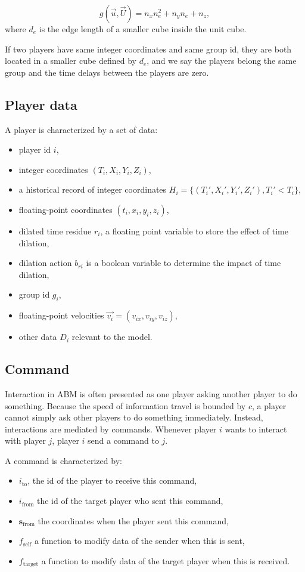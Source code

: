 \documentclass{article}
\begin{document}
\begin{equation} \label{eq:group}
    g(\overrightarrow{u}, \overrightarrow{U}) = n_x n_e^2 + n_y n_e + n_z,
\end{equation}
where $d_e$ is the edge length of a smaller cube inside the unit cube.

If two players have same integer coordinates and same group id,
they are both located in a smaller cube defined by $d_e$, 
and we say the players belong the same group and the time delays between the players are zero.

\subsection{Player data}

A player is characterized by a set of data:
\begin{itemize}
  \item player id $i$,
  \item integer coordinates $(T_i, X_i, Y_i, Z_i)$,
  \item a historical record of integer coordinates $H_i = \{(T_i', X_i', Y_i', Z_i'), T_i' < T_i \}$,
  \item floating-point coordinates $(t_i, x_i, y_i, z_i)$,
  \item dilated time residue $r_i$, a floating point variable to store the effect of time dilation,
  \item dilation action $b_{ri}$ is a boolean variable to determine the impact of time dilation,
  \item group id $g_i$,
  \item floating-point velocities $\overrightarrow{v_i} = (v_{ix}, v_{iy}, v_{iz})$,
  \item other data $D_i$ relevant to the model.
\end{itemize}

\subsection{Command}

Interaction in ABM is often presented as one player asking
another player to do something.
Because the speed of information travel is bounded by $c$,
a player cannot simply ask other players to do something immediately.
Instead, interactions are mediated by commands.
Whenever player $i$ wants to interact with player $j$, 
player $i$ send a command to $j$. 

A command is characterized by:
\begin{itemize}
  \item $i_{\textrm{to}}$, the id of the player to receive this command,
  \item $i_{\textrm{from}}$ the id of the target player who sent this command,
  \item $\textbf{s}_{\textrm{from}}$ the coordinates when the player sent this command,
  \item $f_{\text{self}}$ a function to modify data of the sender when this is sent,
  \item $f_{\text{target}}$ a function to modify data of the target player when this is received.
\end{itemize}
\end{document}
